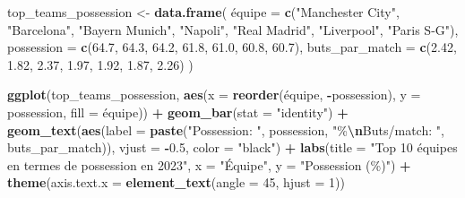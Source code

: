 \documentclass[
]{article}
\newenvironment{Shaded}{\begin{snugshade}}{\end{snugshade}}
\newcommand{\AttributeTok}[1]{\textcolor[rgb]{0.13,0.29,0.53}{#1}}
\newcommand{\DecValTok}[1]{\textcolor[rgb]{0.00,0.00,0.81}{#1}}
\newcommand{\FloatTok}[1]{\textcolor[rgb]{0.00,0.00,0.81}{#1}}
\newcommand{\FunctionTok}[1]{\textcolor[rgb]{0.13,0.29,0.53}{\textbf{#1}}}
\newcommand{\NormalTok}[1]{#1}
\newcommand{\OtherTok}[1]{\textcolor[rgb]{0.56,0.35,0.01}{#1}}
\newcommand{\SpecialCharTok}[1]{\textcolor[rgb]{0.81,0.36,0.00}{\textbf{#1}}}
\newcommand{\StringTok}[1]{\textcolor[rgb]{0.31,0.60,0.02}{#1}}
\begin{document}
\begin{Shaded}
\begin{Highlighting}[]
\NormalTok{top\_teams\_possession }\OtherTok{\textless{}{-}} \FunctionTok{data.frame}\NormalTok{(}
\NormalTok{  é}\AttributeTok{quipe =} \FunctionTok{c}\NormalTok{(}\StringTok{"Manchester City"}\NormalTok{, }\StringTok{"Barcelona"}\NormalTok{, }\StringTok{"Bayern Munich"}\NormalTok{, }\StringTok{"Napoli"}\NormalTok{, }\StringTok{"Real Madrid"}\NormalTok{, }\StringTok{"Liverpool"}\NormalTok{, }\StringTok{"Paris S{-}G"}\NormalTok{),}
  \AttributeTok{possession =} \FunctionTok{c}\NormalTok{(}\FloatTok{64.7}\NormalTok{, }\FloatTok{64.3}\NormalTok{, }\FloatTok{64.2}\NormalTok{, }\FloatTok{61.8}\NormalTok{, }\FloatTok{61.0}\NormalTok{, }\FloatTok{60.8}\NormalTok{, }\FloatTok{60.7}\NormalTok{),}
  \AttributeTok{buts\_par\_match =} \FunctionTok{c}\NormalTok{(}\FloatTok{2.42}\NormalTok{, }\FloatTok{1.82}\NormalTok{, }\FloatTok{2.37}\NormalTok{, }\FloatTok{1.97}\NormalTok{, }\FloatTok{1.92}\NormalTok{, }\FloatTok{1.87}\NormalTok{, }\FloatTok{2.26}\NormalTok{)}
\NormalTok{)}

\FunctionTok{ggplot}\NormalTok{(top\_teams\_possession, }\FunctionTok{aes}\NormalTok{(}\AttributeTok{x =} \FunctionTok{reorder}\NormalTok{(équipe, }\SpecialCharTok{{-}}\NormalTok{possession), }\AttributeTok{y =}\NormalTok{ possession, }\AttributeTok{fill =}\NormalTok{ équipe)) }\SpecialCharTok{+}
  \FunctionTok{geom\_bar}\NormalTok{(}\AttributeTok{stat =} \StringTok{"identity"}\NormalTok{) }\SpecialCharTok{+}
  \FunctionTok{geom\_text}\NormalTok{(}\FunctionTok{aes}\NormalTok{(}\AttributeTok{label =} \FunctionTok{paste}\NormalTok{(}\StringTok{"Possession: "}\NormalTok{, possession, }\StringTok{"\%}\SpecialCharTok{\textbackslash{}n}\StringTok{Buts/match: "}\NormalTok{, buts\_par\_match)), }
            \AttributeTok{vjust =} \SpecialCharTok{{-}}\FloatTok{0.5}\NormalTok{, }\AttributeTok{color =} \StringTok{"black"}\NormalTok{) }\SpecialCharTok{+}
  \FunctionTok{labs}\NormalTok{(}\AttributeTok{title =} \StringTok{"Top 10 équipes en termes de possession en 2023"}\NormalTok{,}
       \AttributeTok{x =} \StringTok{"Équipe"}\NormalTok{,}
       \AttributeTok{y =} \StringTok{"Possession (\%)"}\NormalTok{) }\SpecialCharTok{+}
  \FunctionTok{theme}\NormalTok{(}\AttributeTok{axis.text.x =} \FunctionTok{element\_text}\NormalTok{(}\AttributeTok{angle =} \DecValTok{45}\NormalTok{, }\AttributeTok{hjust =} \DecValTok{1}\NormalTok{))}
\end{Highlighting}
\end{Shaded}
\end{document}
